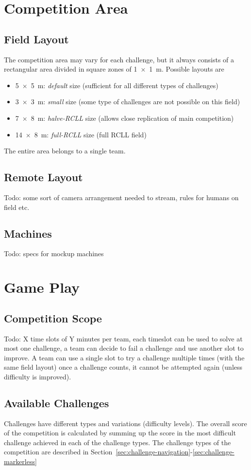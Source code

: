 \documentclass[12pt,twoside]{article}
\newcommand{\refsec}[1]{Section~\ref{#1}}
\begin{document}
\section{Competition Area}
\subsection{Field Layout}
The competition area may vary for each challenge, but it always consists of
a rectangular area divided in square zones of \SI{1 x 1}{\metre}.
Possible layouts are
\begin{itemize}
\item \SI{5 x 5}{\metre}: \emph{default} size
	(sufficient for all different types of challenges)
\item \SI{3 x 3}{\metre}: \emph{small} size
	(some type of challenges are not possible on this field)
\item \SI{7 x 8}{\metre}: \emph{halve-RCLL} size
	(allows close replication of main competition)
\item \SI{14 x 8}{\metre}: \emph{full-RCLL} size
	(full RCLL field)
\end{itemize}

The entire area belongs to a single team.
\subsection{Remote Layout}
Todo: some sort of camera arrangement needed to stream, rules for humans on
field etc.
\subsection{Machines}
Todo: specs for mockup machines
\section{Game Play}
\subsection{Competition Scope}
Todo: X time slots of Y minutes per team, each timeslot can be used to solve
at most one challenge, a team can decide to fail a challenge and use another
slot to improve.
A team can use a single slot to try a challenge multiple times (with the same
field layout) once a challenge counts, it cannot be attempted again
(unless difficulty is improved).

\subsection{Available Challenges}
Challenges have different types and variations (difficulty levels).
The overall score of the competition is calculated by summing up the score
in the most difficult challenge achieved in each of the challenge types.
The challenge types of the competition are described in
\refsec{sec:challenge-navigation}-\ref{sec:challenge-markerless}
\end{document}
